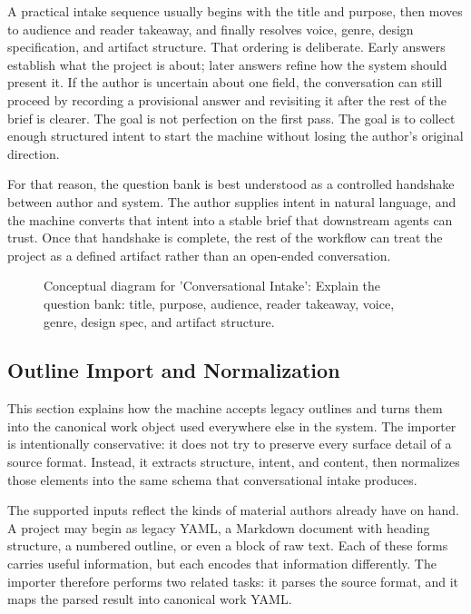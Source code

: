 \documentclass[11pt]{article}
\begin{document}
A practical intake sequence usually begins with the title and purpose, then moves to audience and reader takeaway, and finally resolves voice, genre, design specification, and artifact structure. That ordering is deliberate. Early answers establish what the project is about; later answers refine how the system should present it. If the author is uncertain about one field, the conversation can still proceed by recording a provisional answer and revisiting it after the rest of the brief is clearer. The goal is not perfection on the first pass. The goal is to collect enough structured intent to start the machine without losing the author's original direction.

For that reason, the question bank is best understood as a controlled handshake between author and system. The author supplies intent in natural language, and the machine converts that intent into a stable brief that downstream agents can trust. Once that handshake is complete, the rest of the workflow can treat the project as a defined artifact rather than an open-ended conversation.

\begin{figure}[htbp]
\centering

\caption{Conceptual diagram for 'Conversational Intake': Explain the question bank: title, purpose, audience, reader takeaway, voice, genre, design spec, and artifact structure.}
\end{figure}



\subsection{Outline Import and Normalization}


This section explains how the machine accepts legacy outlines and turns them into the canonical work object used everywhere else in the system. The importer is intentionally conservative: it does not try to preserve every surface detail of a source format. Instead, it extracts structure, intent, and content, then normalizes those elements into the same schema that conversational intake produces.

The supported inputs reflect the kinds of material authors already have on hand. A project may begin as legacy YAML, a Markdown document with heading structure, a numbered outline, or even a block of raw text. Each of these forms carries useful information, but each encodes that information differently. The importer therefore performs two related tasks: it parses the source format, and it maps the parsed result into canonical work YAML.
\end{document}
